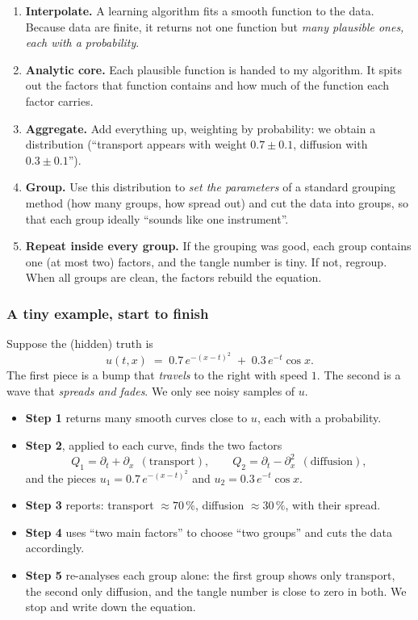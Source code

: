\documentclass[11pt]{article}
\theoremstyle{plain}
\theoremstyle{definition}
\theoremstyle{remark}
\begin{document}
\begin{enumerate}[leftmargin=*]
\item \textbf{Interpolate.} A learning algorithm fits a smooth function to the data. Because data are finite, it returns not one function but \emph{many plausible ones, each with a probability}.
\item \textbf{Analytic core.} Each plausible function is handed to my algorithm. It spits out the factors that function contains and how much of the function each factor carries.
\item \textbf{Aggregate.} Add everything up, weighting by probability: we obtain a distribution (``transport appears with weight $0.7\pm0.1$, diffusion with $0.3\pm0.1$'').
\item \textbf{Group.} Use this distribution to \emph{set the parameters} of a standard grouping method (how many groups, how spread out) and cut the data into groups, so that each group ideally ``sounds like one instrument''.
\item \textbf{Repeat inside every group.} If the grouping was good, each group contains one (at most two) factors, and the tangle number is tiny. If not, regroup. When all groups are clean, the factors rebuild the equation.
\end{enumerate}

\subsubsection*{A tiny example, start to finish}
Suppose the (hidden) truth is
\[
u(t,x)\;=\;0.7\,e^{-(x-t)^2}\;+\;0.3\,e^{-t}\cos x .
\]
The first piece is a bump that \emph{travels} to the right with speed $1$. The second is a wave that \emph{spreads and fades}. We only see noisy samples of $u$.
\begin{itemize}[nosep]
\item \textbf{Step 1} returns many smooth curves close to $u$, each with a probability.
\item \textbf{Step 2}, applied to each curve, finds the two factors
\[
Q_1=\partial_t+\partial_x\ \ (\text{transport}),\qquad Q_2=\partial_t-\partial_x^2\ \ (\text{diffusion}),
\]
and the pieces $u_1=0.7\,e^{-(x-t)^2}$ and $u_2=0.3\,e^{-t}\cos x$.
\item \textbf{Step 3} reports: transport $\approx 70\,\%$, diffusion $\approx 30\,\%$, with their spread.
\item \textbf{Step 4} uses ``two main factors'' to choose ``two groups'' and cuts the data accordingly.
\item \textbf{Step 5} re-analyses each group alone: the first group shows only transport, the second only diffusion, and the tangle number is close to zero in both. We stop and write down the equation.
\end{itemize}
\end{document}
